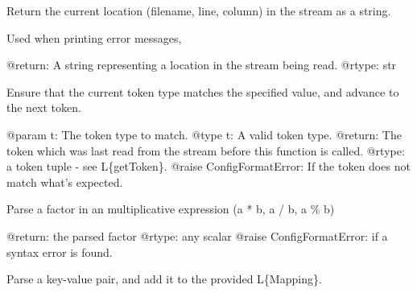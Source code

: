 \documentclass[a4paper,10pt,english]{sphinxmanual}
\begin{document}
\begin{fulllineitems}
\begin{fulllineitems}
\end{fulllineitems}


\begin{fulllineitems}
\label{commands/apidoc/src:src.pyconf.ConfigReader.location}
Return the current location (filename, line, column) in the stream
as a string.

Used when printing error messages,

@return: A string representing a location in the stream being read.
@rtype: str

\end{fulllineitems}


\begin{fulllineitems}
\label{commands/apidoc/src:src.pyconf.ConfigReader.match}
Ensure that the current token type matches the specified value, and
advance to the next token.

@param t: The token type to match.
@type t: A valid token type.
@return: The token which was last read from the stream before this
function is called.
@rtype: a token tuple - see L\{getToken\}.
@raise ConfigFormatError: If the token does not match what's expected.

\end{fulllineitems}


\begin{fulllineitems}
\label{commands/apidoc/src:src.pyconf.ConfigReader.parseFactor}
Parse a factor in an multiplicative expression (a * b, a / b, a \% b)

@return: the parsed factor
@rtype: any scalar
@raise ConfigFormatError: if a syntax error is found.

\end{fulllineitems}


\begin{fulllineitems}
\label{commands/apidoc/src:src.pyconf.ConfigReader.parseKeyValuePair}
Parse a key-value pair, and add it to the provided L\{Mapping\}.


\end{fulllineitems}
\end{fulllineitems}
\end{document}
